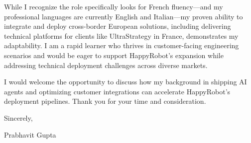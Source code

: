 \documentclass[11pt,a4paper]{article}
\begin{document}
\vspace{1em}
\noindent
While I recognize the role specifically looks for French fluency—and my professional languages are currently English and Italian—my proven ability to integrate and deploy cross-border European solutions, including delivering technical platforms for clients like UltraStrategy in France, demonstrates my adaptability. I am a rapid learner who thrives in customer-facing engineering scenarios and would be eager to support HappyRobot's expansion while addressing technical deployment challenges across diverse markets.

\vspace{1em}
\noindent
I would welcome the opportunity to discuss how my background in shipping AI agents and optimizing customer integrations can accelerate HappyRobot's deployment pipelines. Thank you for your time and consideration.

\vspace{2em}
\noindent
Sincerely,

\vspace{1em}
\noindent
Prabhavit Gupta
\end{document}
